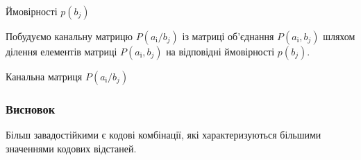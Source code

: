 \documentclass[a4paper,14pt]{extreport}
\begin{document}
\begin{table}[H]
	\caption{Ймовірності $p(b_j )$}
	\centering
	\resizebox{\columnwidth}{!}{%
		
	}	
	\label{table:sums}
\end{table}

Побудуємо канальну матрицю $P(a_{і} / b_{j} )$ із матриці об'єднання $P(a_{і}, b_{j} )$ шляхом ділення елементів матриці $P(a_{і}, b_{j} )$ на відповідні ймовірності $p(b_j )$.


\begin{table}[H]
	\caption{Канальна матриця $P(a_{і} / b_{j} )$ }
	\centering
	\resizebox{\columnwidth}{!}{%
		
	}	
	\label{table:channel_matrix_p_ai_bj}
\end{table}


\subsubsection{Висновок}
Більш завадостійкими є кодові комбінації, які характеризуються більшими
значеннями кодових відстаней.
\end{document}
